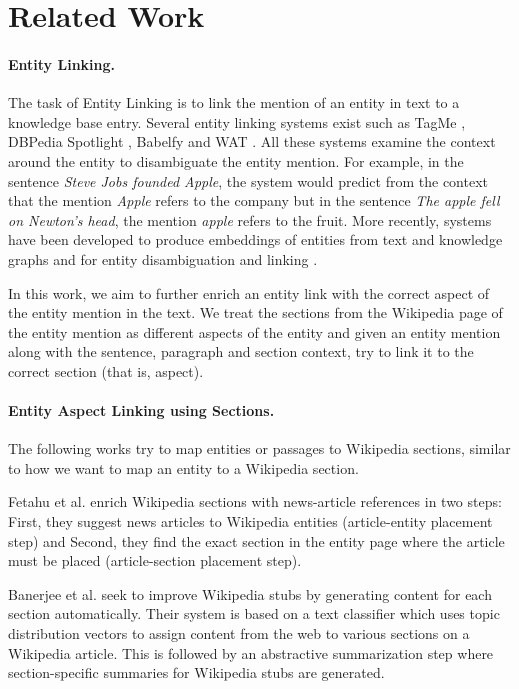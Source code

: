 \documentclass[sigconf,authordraft]{acmart}
\begin{document}
\section{Related Work}
\label{sec:Related Work}
\paragraph{\textbf{Entity Linking.}}
The task of Entity Linking is to link the mention of an entity in text to a knowledge base entry. Several entity linking systems exist such as TagMe \cite{ferragina2010tagme}, DBPedia Spotlight \cite{mendes2011dbpedia}, Babelfy \cite{babelfy} and WAT \cite{piccinno2014wat}. All these systems examine the context around the entity to disambiguate the entity mention. 
For example, in the sentence \textit{Steve Jobs founded Apple}, the system would predict from the context that the mention \textit{Apple} refers to the company but in the sentence \textit{The apple fell on Newton's head}, the mention \textit{apple} refers to the fruit. 
More recently, systems have been developed to produce embeddings of entities from text and knowledge graphs \cite{huang2015leveraging,ristoski2016rdf2vec,yamada2016joint} and for entity disambiguation and linking \cite{yamada2017learning}. 

In this work, we aim to further enrich an entity link with the correct aspect of the entity mention in the text. We treat the sections from the Wikipedia page of the entity mention as different aspects of the entity and given an entity mention along with the sentence, paragraph and section context, try to link it to the correct section (that is, aspect).

\paragraph{\textbf{Entity Aspect Linking using Sections.}} 
The following works try to map entities or passages to Wikipedia sections, similar to how we want to map an entity to a Wikipedia section.

Fetahu et al. \cite{fetahu2015automated} enrich Wikipedia sections with news-article references in two steps: First, they suggest news articles to Wikipedia entities (article-entity placement step) and Second, they find the exact section in the entity page where the article must be placed (article-section placement step).

Banerjee et al. \cite{banerjee2015wikikreator} seek to improve Wikipedia stubs by generating content for each section automatically. Their system is based on a text classifier which uses topic distribution vectors to assign content from the web to various sections on a Wikipedia article. This is followed by an abstractive summarization step where section-specific summaries for Wikipedia stubs are generated.
\end{document}
